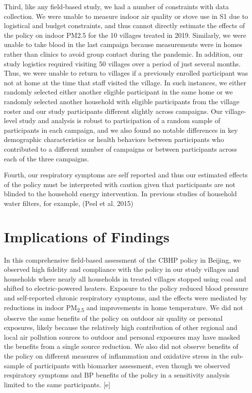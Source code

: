 \documentclass[
  letterpaper,
  DIV=11,
  numbers=noendperiod]{scrartcl}
\begin{document}
Third, like any field-based study, we had a number of constraints with
data collection. We were unable to measure indoor air quality or stove
use in S1 due to logistical and budget constraints, and thus cannot
directly estimate the effects of the policy on indoor PM2.5 for the 10
villages treated in 2019. Similarly, we were unable to take blood in the
last campaign because measurements were in homes rather than clinics to
avoid group contact during the pandemic. In addition, our study
logistics required visiting 50 villages over a period of just several
months. Thus, we were unable to return to villages if a previously
enrolled participant was not at home at the time that staff visited the
village. In such instances, we either randomly selected either another
eligible participant in the same home or we randomly selected another
household with eligible participants from the village roster and our
study participants different slightly across campaigns. Our
village-level study and analysis is robust to participation of a random
sample of participants in each campaign, and we also found no notable
differences in key demographic characteristics or health behaviors
between participants who contributed to a different number of campaigns
or between participants across each of the three campaigns.

Fourth, our respiratory symptoms are self reported and thus our
estimated effects of the policy must be interpreted with caution given
that participants are not blinded to the household energy intervention.
In previous studies of household water filters, for example, (Peel et
al. 2015)

\hypertarget{implications-of-findings}{%
\section{Implications of Findings}\label{implications-of-findings}}

In this comprehensive field-based assessment of the CBHP policy in
Beijing, we observed high fidelity and compliance with the policy in our
study villages and households where nearly all households in treated
villages stopped using coal and shifted to electric-powered heaters.
Exposure to the policy reduced blood pressure and self-reported chronic
respiratory symptoms, and the effects were mediated by reductions in
indoor PM\textsubscript{2.5} and improvements in home temperature. We
did not observe the same benefits of the policy on outdoor air quality
or personal exposures, likely because the relatively high contribution
of other regional and local air pollution sources to outdoor and
personal exposures may have masked the benefits from a single source
reduction. We also did not observe benefits of the policy on different
measures of inflammation and oxidative stress in the sub-sample of
participants with biomarker assessment, even though we observed
respiratory symptoms and BP benefits of the policy in a sensitivity
analysis limited to the same participants. {[}e{]}
\end{document}
